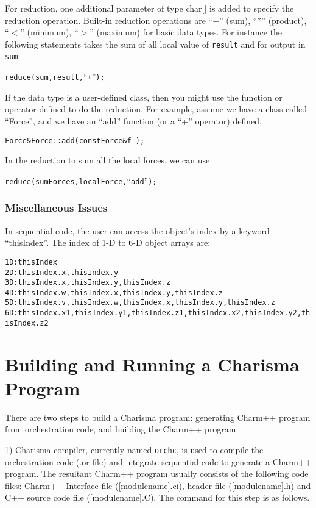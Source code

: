 \documentclass[10pt]{article}
\def\code#1{{\small {\tt {#1}}}}
\begin{document}
For reduction, one additional parameter of type char[] is added to specify the
reduction operation. Built-in reduction operations are ``+'' (sum), ``*'' (product),
``$<$'' (minimum), ``$>$'' (maximum) for basic data types. For instance the 
following statements takes the sum of all local value of \code{result} and 
for output in \code{sum}.

\begin{alltt}
    reduce(sum, result, ``+'');
\end{alltt}

If the data type is a user-defined class, then you might use the function or
operator defined to do the reduction. For example, assume we have a class
called ``Force'', and we have an ``add'' function (or a ``+'' operator) defined.

\begin{alltt}
    Force& Force::add(const Force& f_);
\end{alltt}

In the reduction to sum all the local forces, we can use

\begin{alltt}
    reduce(sumForces, localForce, ``add'');
\end{alltt}

\subsubsection{Miscellaneous Issues}
In sequential code, the user can access the object's index by a keyword 
``thisIndex''. The index of 1-D to 6-D object arrays are:

\begin{alltt}
1D: thisIndex
2D: thisIndex.x, thisIndex.y
3D: thisIndex.x, thisIndex.y, thisIndex.z
4D: thisIndex.w, thisIndex.x, thisIndex.y, thisIndex.z
5D: thisIndex.v, thisIndex.w, thisIndex.x, thisIndex.y, thisIndex.z
6D: thisIndex.x1, thisIndex.y1, thisIndex.z1, thisIndex.x2, thisIndex.y2, thisIndex.z2
\end{alltt}

\section{Building and Running a Charisma Program}
There are two steps to build a Charisma program: generating Charm++ program 
from orchestration code, and building the Charm++ program. 

1) Charisma compiler, currently named \code{orchc}, is used to compile the
orchestration code (.or file) and integrate sequential code to generate a
Charm++ program. The resultant Charm++ program usually consists of the 
following code files: Charm++ Interface file ([modulename].ci), header file 
([modulename].h) and C++ source code file ([modulename].C). The command 
for this step is as follows.
\end{document}
